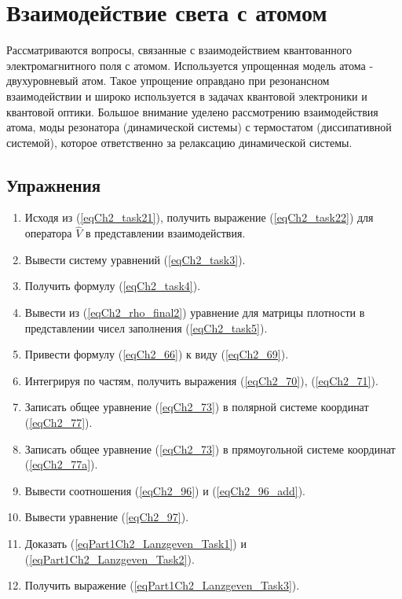 \chapter{Взаимодействие света с атомом}

Рассматриваются вопросы, связанные с взаимодействием квантованного
электромагнитного поля с атомом. Используется упрощенная модель атома -
двухуровневый атом. Такое упрощение оправдано при резонансном
взаимодействии и широко используется в задачах квантовой электроники и
квантовой оптики. Большое внимание уделено рассмотрению
взаимодействия атома, моды резонатора (динамической системы) с
термостатом (диссипативной системой), которое ответственно за
релаксацию динамической системы.  














\section{Упражнения}
\begin{enumerate}
\item Исходя из (\ref{eqCh2_task21}), получить выражение
  (\ref{eqCh2_task22}) для оператора $\hat{V}$ в представлении
  взаимодействия. 
\item Вывести систему уравнений (\ref{eqCh2_task3}).
\item Получить формулу (\ref{eqCh2_task4}).
\item Вывести из (\ref{eqCh2_rho_final2}) уравнение для матрицы
  плотности в представлении чисел заполнения (\ref{eqCh2_task5}). 
\item Привести формулу (\ref{eqCh2_66}) к виду (\ref{eqCh2_69}).
\item Интегрируя по частям, получить выражения (\ref{eqCh2_70}),
  (\ref{eqCh2_71}).
\item Записать общее уравнение (\ref{eqCh2_73}) в полярной системе
  координат (\ref{eqCh2_77}). 
\item Записать общее уравнение (\ref{eqCh2_73}) в прямоугольной
  системе координат (\ref{eqCh2_77a}). 
\item Вывести соотношения (\ref{eqCh2_96}) и (\ref{eqCh2_96_add}).
\item Вывести уравнение (\ref{eqCh2_97}).
\item Доказать (\ref{eqPart1Ch2_Lanzgeven_Task1}) и (\ref{eqPart1Ch2_Lanzgeven_Task2}).
\item Получить выражение (\ref{eqPart1Ch2_Lanzgeven_Task3}).
\end{enumerate}

